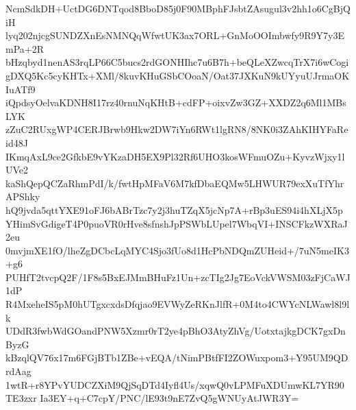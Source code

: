 NcmSdkDH+UctDG6DNTqod8BboD85j0F90MBphFJsbtZAsugul3v2hh1o6CgBjQiH
lyq202njcgSUNDZXnEsNMNQqWfwtUK3ax7ORL+GnMoOOImbwfy9R9Y7y3EmPa+2R
bHzqbyd1nenAS3rqLP66C5bucs2rdGONHIhc7u6B7h+beQLeXZwcqTrX7i6wCogi
gDXQ5Kc5cyKHTx+XMl/8kuvKHuGSbCOoaN/Oat37JXKuN9kUYyuUJrmaOKIuATf9
iQpdsyOelvaKDNH8I17rz40rnuNqKHtB+cdFP+oixvZw3GZ+XXDZ2q6Ml1MBsLYK
zZuC2RUxgWP4CERJBrwb9Hkw2DW7iYn6RWt1lgRN8/8NK0i3ZAhKIHYFaReid48J
IKmqAxL9ce2GfkbE9vYKzaDH5EX9Pl32Rf6UHO3kosWFmuOZu+KyvzWjxy1lUVe2
kaShQepQCZaRhmPdI/k/fwtHpMFaV6M7kfDbaEQMw5LHWUR79exXuTfYhrAPShky
hQ9jvda5qttYXE91oFJ6bABrTzc7y2j3huTZqX5jcNp7A+rBp3uES94i4hXLjX5p
YHimSvGdigeT4P0puoVR0rHve8sfnshJpPSWbLUpel7WbqVI+INSCFkzWXRaJ2eu
0mvjmXE1fO/lheZgDCbcLqMYC4Sjo3fUo8d1HcPbNDQmZUHeid+/7uN5meIK3+g6
PUHfT2tvcpQ2F/1F8s5BxEJMmBHuFz1Un+zcTIg2Jg7EoVckVWSM03zFjCaWJ1dP
R4MxeheIS5pM0hUTgxcxdsDfqjao9EVWyZeRKnJlfR+0M4to4CWYcNLWawl8l9lk
UDdR3fwbWdGOandPNW5Xzmr0rT2ye4pBhO3AtyZhVg/UotxtajkgDCK7gxDnByzG
kBzqlQV76x17m6FGjBTb1ZBe+vEQA/tNimPBtfFI2ZOWuxpom3+Y95UM9QDrdAag
1wtR+r8YPvYUDCZXiM9QjSqDTd4Iyfl4Us/xqwQ0vLPMFuXDUmwKL7YR90TE3zxr
Ia3EY+q+C7cpY/PNC/lE93t9nE7ZvQ5gWNUyAtJWR3Y=
